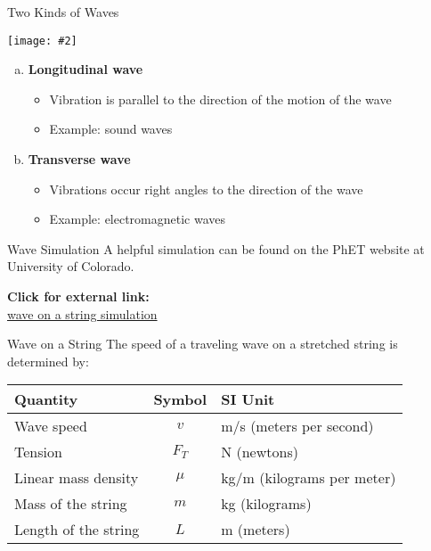 \documentclass[12pt,aspectratio=169]{beamer}
\newcommand{\pic}[2]{\texttt{[image: \#2]}}
\newcommand{\eq}[2]{\vspace{#1}{\Large\begin{displaymath}#2\end{displaymath}}}
\begin{document}
\begin{frame}{Two Kinds of Waves}
  \begin{center}
    \pic{.6}{main-qimg.png}
  \end{center}
  \begin{enumerate}[a.]
  \item\vspace{-.2in}\textbf{Longitudinal wave}
    \begin{itemize}
    \item Vibration is parallel to the direction of the motion of the wave
    \item Example: sound waves
    \end{itemize}
  \item\textbf{Transverse wave}
    \begin{itemize}
    \item Vibrations occur right angles to the direction of the wave
    \item Example: electromagnetic waves
    \end{itemize}
  \end{enumerate}
\end{frame}

\begin{frame}{Wave Simulation}
  A helpful simulation can be found on the PhET website at University of
  Colorado.
  \begin{center}
    \textbf{Click for external link:}\\
    \href{https://phet.colorado.edu/sims/html/wave-on-a-string/latest/wave-on-a-string_en.html}
         {wave on a string simulation}
  \end{center}
\end{frame}



\begin{frame}{Wave on a String}
  The speed of a traveling wave on a stretched string is determined by:

  \eq{-.2in}{
    \boxed{v=\sqrt{\frac{F_T}{\mu}}}
    \quad\text{\normalsize where}\quad
    \boxed{\mu=\frac{m}{L}}
  }
  \begin{center}
    \begin{tabular}{l|c|l}
      \rowcolor{pink}
      \textbf{Quantity} & \textbf{Symbol} & \textbf{SI Unit} \\ \hline
      Wave speed    & $v$    & \si{m/s} (meters per second) \\
      Tension       & $F_T$  & \si{\newton} (newtons)\\
      Linear mass density & $\mu$ & \si{\kilo\gram/\metre} (kilograms per meter)
      \\
      Mass of the string & $m$    & \si{\kilo\gram} (kilograms)\\
      Length of the string & $L$ & \si{\metre} (meters)
    \end{tabular}
  \end{center}
\end{frame}
\end{document}
